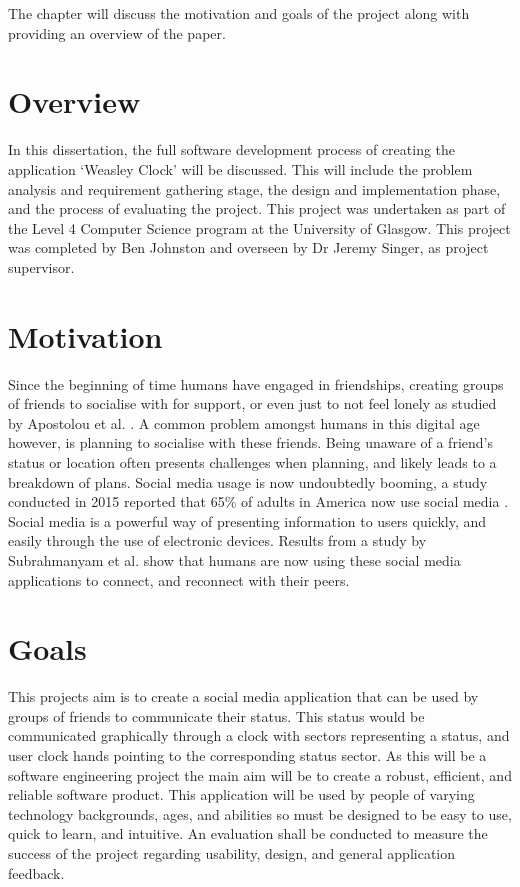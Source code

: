 The chapter will discuss the motivation and goals of the project along with providing an overview of the paper.

\section{Overview}

In this dissertation, the full software development process of creating the application `Weasley Clock' will be discussed. This will include the problem analysis and requirement gathering stage, the design and implementation phase, and the process of evaluating the project. This project was undertaken as part of the Level 4 Computer Science program at the University of Glasgow. This project was completed by Ben Johnston and overseen by Dr Jeremy Singer, as project supervisor.

\section{Motivation}
Since the beginning of time humans have engaged in friendships, creating groups of friends to socialise with for support, or even just to not feel lonely as studied by Apostolou et al. \cite{whyFriends}. A common problem amongst humans in this digital age however, is planning to socialise with these friends. Being unaware of a friend's status or location often presents challenges when planning, and likely leads to a breakdown of plans.  \newline\newline
Social media usage is now undoubtedly booming, a study conducted in 2015 reported that 65\% of adults in America now use social media \cite{socialMediaUsage}. Social media is a powerful way of presenting information to users quickly, and easily through the use of electronic devices. Results from a study by Subrahmanyam et al. \cite{SUBRAHMANYAM2008420} show that humans are now using these social media applications to connect, and reconnect with their peers.


\section{Goals}
This projects aim is to create a social media application that can be used by groups of friends to communicate their status. This status would be communicated graphically through a clock with sectors representing a status, and user clock hands pointing to the corresponding status sector. As this will be a software engineering project the main aim will be to create a robust, efficient, and reliable software product. This application will be used by people of varying technology backgrounds, ages, and abilities so must be designed to be easy to use, quick to learn, and intuitive. An evaluation shall be conducted to measure the success of the project regarding usability, design, and general application feedback.


